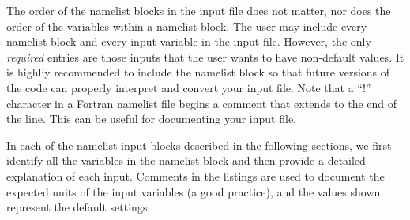 The order of the namelist blocks in the input file does not matter,
nor does the order of the variables within a namelist block.
%
The user may include every namelist block and every input variable
in the input file.
%
However, the only \emph{required} entries are those inputs that the user wants
to have non-default values.
%
It is highliy recommended to include the 
namelist block so that future versions of the code can properly
interpret and convert your input file.
%
%
Note that a ``!'' character in a Fortran namelist file begins a comment that
extends to the end of the line.
%
This can be useful for documenting your input file.


In each of the namelist input blocks described in the following sections,
we first identify all the variables in the namelist block and then provide
a detailed explanation of each input.
%
Comments in the listings are used to document the expected units of the input
variables (a good practice), and the values shown represent the default
settings.

























%
%


